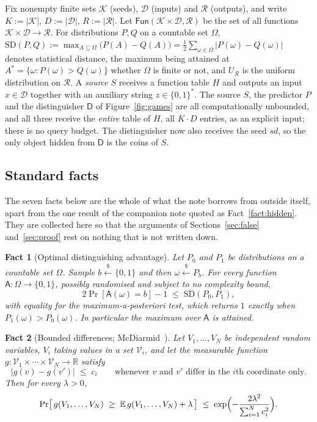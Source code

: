 \documentclass{aicr-solution}
\newcommand{\Fun}{\mathsf{Fun}}
\newcommand{\sd}{\mathit{sd}}
\renewcommand{\sample}{\stackrel{{\scriptscriptstyle\$}}{\leftarrow}}
\newcommand{\SD}{\mathrm{SD}}
\newcommand{\calK}{\mathcal{K}}
\newcommand{\calD}{\mathcal{D}}
\newcommand{\calR}{\mathcal{R}}
\newtheorem{fact}{Fact}
\begin{document}
Fix nonempty finite sets $\calK$ (seeds), $\calD$ (inputs) and $\calR$ (outputs), and write
$K := |\calK|$, $D := |\calD|$, $R := |\calR|$. Let $\Fun(\calK \times \calD, \calR)$ be the set of
all functions $\calK \times \calD \to \calR$. For distributions $P, Q$ on a countable set $\Omega$,
\(
  \SD(P,Q) := \max_{A \subseteq \Omega}\bigl(P(A) - Q(A)\bigr)
            = \tfrac12 \sum_{\omega \in \Omega} |P(\omega) - Q(\omega)|
\)
denotes statistical distance, the maximum being attained at
$A^{*} = \{\omega : P(\omega) > Q(\omega)\}$ whether $\Omega$ is finite or not, and $U_{\calR}$ is the uniform distribution on $\calR$. A
\emph{source} $S$ receives a function table $H$ and outputs an input $x \in \calD$ together with an
auxiliary string $z \in \{0,1\}^{*}$. The source $S$, the predictor $P$ and the distinguisher $\mathsf{D}$ of
Figure~\ref{fig:games} are all computationally unbounded, and all three receive the \emph{entire}
table of $H$, all $K \cdot D$ entries, as an explicit input; there is no query budget. The
distinguisher now also receives the seed $\sd$, so the only object hidden from $\mathsf{D}$ is the
coins of $S$.

\subsection{Standard facts}\label{sec:facts}

The seven facts below are the whole of what the note borrows from outside itself, apart from the
one result of the companion note quoted as Fact~\ref{fact:hidden}. They are collected here so
that the arguments of Sections~\ref{sec:false} and~\ref{sec:proof} rest on nothing that is not
written down.

\begin{fact}[Optimal distinguishing advantage]\label{fact:sd}
Let $P_0$ and $P_1$ be distributions on a countable set $\Omega$. Sample $b \sample \{0,1\}$ and
then $\omega \sample P_b$. For every function $\mathsf{A} \colon \Omega \to \{0,1\}$, possibly
randomised and subject to no complexity bound,
\[
  2\Pr[\mathsf{A}(\omega) = b] - 1 \;\le\; \SD(P_0,P_1) ,
\]
with equality for the maximum-a-posteriori test, which returns $1$ exactly when
$P_1(\omega) > P_0(\omega)$. In particular the maximum over $\mathsf{A}$ is attained.
\end{fact}

\begin{fact}[Bounded differences; McDiarmid~\cite{McD89}]\label{fact:mcd}
Let $V_1, \dots, V_N$ be independent random variables, $V_i$ taking values in a set
$\mathcal{V}_i$, and let the measurable function
$g \colon \mathcal{V}_1 \times \cdots \times \mathcal{V}_N \to \mathbb{R}$ satisfy
\[
  |g(v) - g(v')| \;\le\; c_i
  \qquad\text{whenever $v$ and $v'$ differ in the $i$th coordinate only.}
\]
Then for every $\lambda > 0$,
\[
  \Pr\bigl[\, g(V_1,\dots,V_N) \;\ge\; \mathbb{E}\,g(V_1,\dots,V_N) + \lambda \,\bigr]
  \;\le\; \exp\Bigl(-\frac{2\lambda^{2}}{\sum_{i=1}^{N} c_i^{2}}\Bigr) .
\]
\end{fact}
\end{document}
